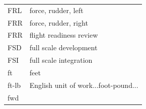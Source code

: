 \documentclass[
]{book}
\begin{document}
\begin{longtable}[]{@{}ll@{}}
\begin{minipage}[t]{0.47\columnwidth}\raggedright
FRL\strut
\end{minipage} & \begin{minipage}[t]{0.47\columnwidth}\raggedright
force, rudder, left\strut
\end{minipage}\tabularnewline
\begin{minipage}[t]{0.47\columnwidth}\raggedright
FRR\strut
\end{minipage} & \begin{minipage}[t]{0.47\columnwidth}\raggedright
force, rudder, right\strut
\end{minipage}\tabularnewline
\begin{minipage}[t]{0.47\columnwidth}\raggedright
FRR\strut
\end{minipage} & \begin{minipage}[t]{0.47\columnwidth}\raggedright
flight readiness review\strut
\end{minipage}\tabularnewline
\begin{minipage}[t]{0.47\columnwidth}\raggedright
FSD\strut
\end{minipage} & \begin{minipage}[t]{0.47\columnwidth}\raggedright
full scale development\strut
\end{minipage}\tabularnewline
\begin{minipage}[t]{0.47\columnwidth}\raggedright
FSI\strut
\end{minipage} & \begin{minipage}[t]{0.47\columnwidth}\raggedright
full scale integration\strut
\end{minipage}\tabularnewline
\begin{minipage}[t]{0.47\columnwidth}\raggedright
ft\strut
\end{minipage} & \begin{minipage}[t]{0.47\columnwidth}\raggedright
feet\strut
\end{minipage}\tabularnewline
\begin{minipage}[t]{0.47\columnwidth}\raggedright
ft-lb\strut
\end{minipage} & \begin{minipage}[t]{0.47\columnwidth}\raggedright
English unit of work...foot-pound...\strut
\end{minipage}\tabularnewline
\begin{minipage}[t]{0.47\columnwidth}\raggedright
fwd\strut
\end{minipage} & \begin{minipage}[t]{0.47\columnwidth}\raggedright

\end{minipage}
\end{longtable}
\end{document}
